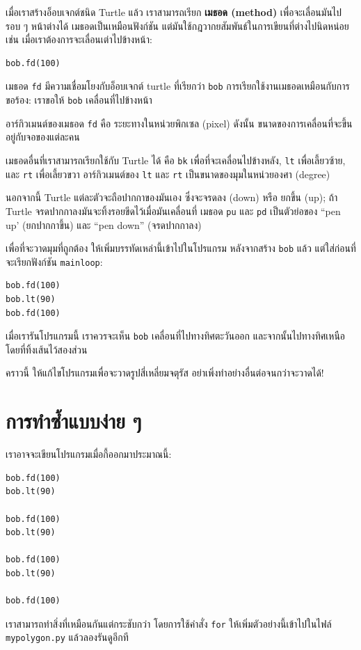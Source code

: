 เมื่อเราสร้างอ็อบเจกต์ชนิด Turtle แล้ว เราสามารถเรียก {\bf เมธอด (method)} เพื่อจะเลื่อนมันไปรอบ ๆ หน้าต่างได้
เมธอดเป็นเหมือนฟังก์ชัน แต่มันใช้กฎวากยสัมพันธ์ในการเขียนที่ต่างไปนิดหน่อย เช่น 
เมื่อเราต้องการจะเลื่อนเต่าไปข้างหน้า:

\begin{verbatim}
bob.fd(100)
\end{verbatim}
%
เมธอด  {\tt fd} มีความเชื่อมโยงกับอ็อบเจกต์ turtle ที่เรียกว่า {\tt bob} การเรียกใช้งานเมธอดเหมือนกับการขอร้อง: เราขอให้ {\tt bob} เคลื่อนที่ไปข้างหน้า

อาร์กิวเมนต์ของเมธอด {\tt fd} คือ ระยะทางในหน่วยพิกเซล (pixel) ดังนั้น ขนาดของการเคลื่อนที่จะขึ้นอยู่กับจอของแต่ละคน

เมธอดอื่นที่เราสามารถเรียกใช้กับ Turtle ได้ คือ {\tt bk} เพื่อที่จะเคลื่อนไปข้างหลัง, {\tt lt} เพื่อเลี้ยวซ้าย, 
และ {\tt rt} เพื่อเลี้ยวขวา อาร์กิวเมนต์ของ {\tt lt} และ {\tt rt} เป็นขนาดของมุมในหน่วยองศา (degree)

นอกจากนี้ Turtle แต่ละตัวจะถือปากกาของมันเอง ซึ่งจะจรดลง (down) หรือ ยกขึ้น (up); 
ถ้า Turtle จรดปากกาลงมันจะทิ้งรอยขีดไว้เมื่อมันเคลื่อนที่  เมธอด {\tt pu} และ {\tt pd} 
เป็นตัวย่อของ ``pen up' (ยกปากกาขึ้น) และ ``pen down'' (จรดปากกาลง)

เพื่อที่จะวาดมุมที่ถูกต้อง ให้เพิ่มบรรทัดเหล่านี้เข้าไปในโปรแกรม หลังจากสร้าง {\tt bob} แล้ว
แต่ใส่ก่อนที่จะเรียกฟังก์ชัน \verb"mainloop":

\begin{verbatim}
bob.fd(100)
bob.lt(90)
bob.fd(100)
\end{verbatim}
%
เมื่อเรารันโปรแกรมนี้ เราควรจะเห็น {\tt bob} เคลื่อนที่ไปทางทิศตะวันออก และจากนั้นไปทางทิศเหนือ
โดยที่ทิ้งเส้นไว้สองส่วน

คราวนี้ ให้แก้ไขโปรแกรมเพื่อจะวาดรูปสี่เหลี่ยมจตุรัส อย่าเพิ่งทำอย่างอื่นต่อจนกว่าจะวาดได้!


\section{การทำซ้ำแบบง่าย ๆ}%
\label{repetition}

เราอาจจะเขียนโปรแกรมเมื่อกี้ออกมาประมาณนี้:

\begin{verbatim}
bob.fd(100)
bob.lt(90)

bob.fd(100)
bob.lt(90)

bob.fd(100)
bob.lt(90)

bob.fd(100)
\end{verbatim}
%
เราสามารถทำสิ่งที่เหมือนกันแต่กระชับกว่า โดยการใช้คำสั่ง {\tt for}  ให้เพิ่มตัวอย่างนี้เข้าไปในไฟล์ 
{\tt mypolygon.py} แล้วลองรันดูอีกที

